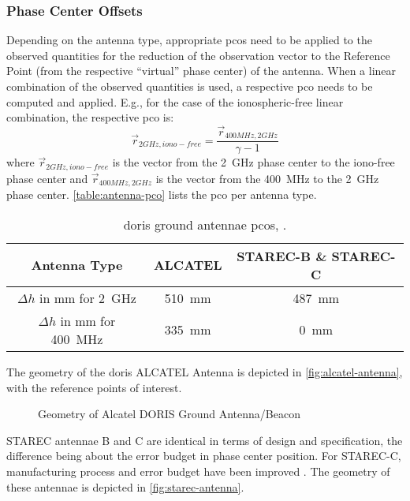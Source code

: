 \subsubsection{Phase Center Offsets}\label{sssec:doris-pco}
Depending on the antenna type, appropriate \glspl{pco} need to be applied to 
the observed quantities for the reduction of the observation vector to the 
Reference Point (from the respective ``virtual'' phase center) of the antenna. 
When a linear combination of the observed quantities is used, a respective 
\gls{pco} needs to be computed and applied. E.g., for the case of the 
ionospheric-free linear combination, the respective \gls{pco} is:
\begin{equation}
    \vec{r}_{2GHz,iono-free} = \frac{\vec{r}_{400MHz,2GHz}}{\gamma - 1}
\end{equation}
where $\vec{r}_{2GHz,iono-free}$ is the vector from the \SI{2}{\GHz} phase
center to the iono-free phase center and $\vec{r}_{400MHz,2GHz}$ is
the vector from the \SI{400}{MHz} to the \SI{2}{\GHz} phase center. \autoref{table:antenna-pco} 
lists the \gls{pco} per antenna type.

\begin{table}[h!]
    \centering
    \begin{tabular}{|c|c|c|}
        \hline
        \textbf{Antenna Type} & \textbf{ALCATEL} & \textbf{STAREC-B} \& \textbf{STAREC-C} \\
        \hline
        $\Delta h$ in \si{\mm} for \SI{2}{\GHz} & \SI{510}{\mm} & \SI{487}{\mm}\\
        $\Delta h$ in \si{\mm} for \SI{400}{\MHz} & \SI{335}{\mm} & \SI{0}{\mm}\\
        \hline
    \end{tabular}
    \caption{\gls{doris} ground antennae \glspl{pco}, \cite{DORISGSM}.}
    \label{table:antenna-pco}
\end{table}

The geometry of the \gls{doris} ALCATEL Antenna is depicted in \autoref{fig:alcatel-antenna}, 
with the reference points of interest.
\begin{figure}
  \centering
  
  \caption{Geometry of Alcatel DORIS Ground Antenna/Beacon}
  \label{fig:alcatel-antenna}
\end{figure}

STAREC antennae B and C are identical in terms of design and specification, the
difference being about the error budget in phase center position. For STAREC-C,
manufacturing process and error budget have been improved \cite{DORISGSM}. The geometry 
of these antennae is depicted in \autoref{fig:starec-antenna}.


